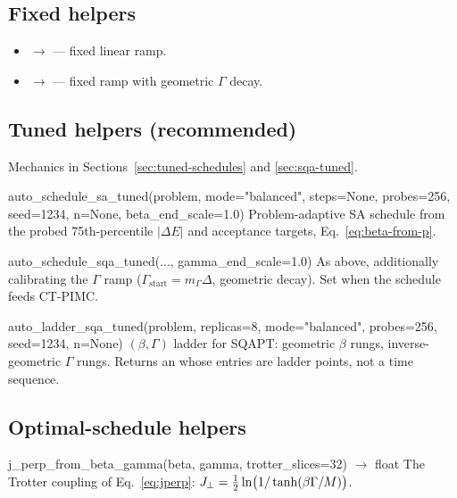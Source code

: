 \subsection{Fixed helpers}

\begin{itemize}
\item {} $\to$  --- fixed linear ramp.
\item {} $\to$
 --- fixed ramp with geometric $\Gamma$ decay.
\end{itemize}

\subsection{Tuned helpers (recommended)}

Mechanics in Sections~\ref{sec:tuned-schedules} and \ref{sec:sqa-tuned}.

\begin{apibox}{auto\_schedule\_sa\_tuned(problem, mode="balanced", steps=None,
probes=256, seed=1234, n=None, beta\_end\_scale=1.0)}
Problem-adaptive SA schedule from the probed 75th-percentile
$|\Delta E|$ and acceptance targets, Eq.~\eqref{eq:beta-from-p}.
\end{apibox}

\begin{apibox}{auto\_schedule\_sqa\_tuned(..., gamma\_end\_scale=1.0)}
As above, additionally calibrating the $\Gamma$ ramp
($\Gamma_{\text{start}}=m_\Gamma\Delta$, geometric decay). Set
 when the schedule feeds CT-PIMC.
\end{apibox}

\begin{apibox}{auto\_ladder\_sqa\_tuned(problem, replicas=8, mode="balanced",
probes=256, seed=1234, n=None)}
$(\beta,\Gamma)$ ladder for SQAPT: geometric $\beta$ rungs, inverse-geometric
$\Gamma$ rungs. Returns an  whose entries are ladder
points, not a time sequence.
\end{apibox}

\subsection{Optimal-schedule helpers}

\begin{apibox}{j\_perp\_from\_beta\_gamma(beta, gamma, trotter\_slices=32)
$\rightarrow$ float}
The Trotter coupling of Eq.~\eqref{eq:jperp}:
$J_{\perp}=\tfrac12\ln\bigl(1/\tanh(\beta\Gamma/M)\bigr)$.
\end{apibox}

